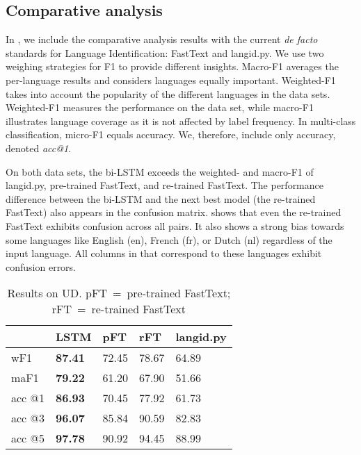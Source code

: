 \documentclass[11pt,a4paper]{article}
\newcommand{\fasttext}{FastText\xspace}
\newcommand{\langidpy}{langid.py\xspace}
\begin{document}
\subsection{Comparative analysis}

In , we include the comparative analysis results with the current \emph{de facto} standards for Language Identification: \fasttext and \langidpy. We use two weighing strategies for F1 to provide different insights. \mbox{Macro-F1} averages the per-language results and considers languages equally important. \mbox{Weighted-F1} takes into account the popularity of the different languages in the data sets. \mbox{Weighted-F1} measures the performance on the data set, while \mbox{macro-F1} illustrates language coverage as it is not affected by label frequency. In \mbox{multi-class} classification, \mbox{micro-F1} equals accuracy. We, therefore, include only accuracy, denoted \emph{acc@1}.

On both data sets, the bi-LSTM exceeds the weighted- and macro-F1 of \langidpy, pre-trained \fasttext, and re-trained \fasttext. The performance difference between the bi-LSTM and the next best model (the re-trained \fasttext) also appears in the confusion matrix.  shows that even the re-trained \fasttext exhibits confusion across all pairs. It also shows a strong bias towards some languages like English (en), French (fr), or Dutch (nl) regardless of the input language. All columns in  that correspond to these languages exhibit confusion errors.

\begin{table}
    \begin{tabular}{|l|l|l|l|l|}
        \hline
        & \textbf{LSTM} & \textbf{pFT} & \textbf{rFT} & \textbf{\langidpy}\\ \hline
        wF1    & \textbf{87.41} & 72.45 & 78.67 & 64.89 \\ \hline
        maF1   & \textbf{79.22} & 61.20 & 67.90 & 51.66 \\ \hline
        acc @1 & \textbf{86.93} & 70.45 & 77.92 & 61.73 \\ \hline
        acc @3 & \textbf{96.07} & 85.84 & 90.59 & 82.83 \\ \hline
        acc @5 & \textbf{97.78} & 90.92 & 94.45 & 88.99 \\ \hline
    \end{tabular}
    \caption{Results on UD. pFT~=~pre-trained \fasttext; rFT~=~re-trained \fasttext}
    \label{tab:ud20}
\end{table}
\end{document}
